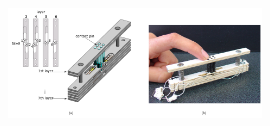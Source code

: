 \begin{figure}\centering
    \includegraphics[width=0.6\textwidth]{figures/piezo-full-design.png}
\caption{}
\label{fig:piezo-full-design}
\end{figure}